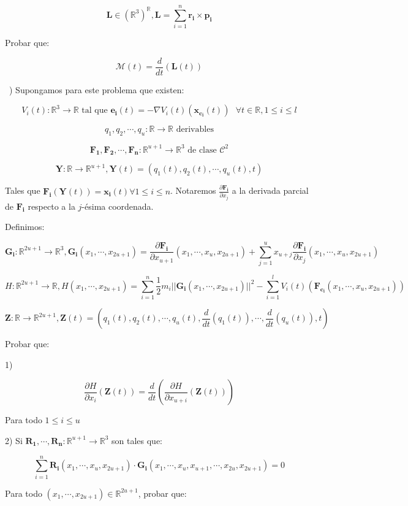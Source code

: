 \documentclass{article}
\newcommand{\FUNCION}{(\mathbb{R}^3)^\mathbb{R}\xspace}
\newcommand{\DT}[1]{\frac{d }{dt}\left( #1 \right)\xspace}
\newcommand{\V}[1]{\mathbf{#1}\xspace}
\newcommand{\M}{\mathcal{M}\xspace}
\newcounter{problemCounter}
\newcommand{\problem}{\stepcounter{problemCounter} \ \newline \theproblemCounter ) \xspace}
\begin{document}
$$\V{L} \in \FUNCION, \V{L} = \sum_{i=1}^{n}{\V{r_i} \times \V{p_i}}$$

Probar que:

$$\M(t) = \DT{\V{L}(t)}$$

\problem Supongamos para este problema que existen:

$$V_i(t) : \mathbb{R}^3 \rightarrow \mathbb{R} \mbox{ tal que } \V{e_i}(t) = -\nabla V_i(t)(\V{x_{c_i}}(t))\ \ \ \forall t\in \mathbb{R}, 1 \leq i \leq l$$

$$q_1,q_2,\cdots,q_u : \mathbb{R} \rightarrow \mathbb{R} \mbox{ derivables}$$

$$\V{F_1},\V{F_2},\cdots,\V{F_n} : \mathbb{R}^{u+1} \rightarrow \mathbb{R}^3 \mbox{ de clase } \mathcal{C}^2$$

$$\V{Y} : \mathbb{R} \rightarrow \mathbb{R}^{u+1} , \V{Y}(t) = (q_1(t),q_2(t),\cdots,q_u(t),t)$$

Tales que $\V{F_i}(\V{Y}(t)) = \V{x_i}(t) \forall 1 \leq i \leq n$. Notaremos $\frac{\partial \V{F_i}}{\partial x_j}$
a la derivada parcial de $\V{F_i}$ respecto a la $j$-ésima coordenada.

Definimos:

$$\V{G_i} : \mathbb{R}^{2u+1} \rightarrow \mathbb{R}^3, \V{G_i}(x_1,\cdots,x_{2u+1}) = 
 \frac{\partial \V{F_i}}{\partial x_{u+1}}(x_1,\cdots,x_u,x_{2u+1}) + \sum_{j=1}^u{x_{u+j} \frac{\partial \V{F_i}}{\partial x_j}(x_1,\cdots,x_u,x_{2u+1})} $$

$$H : \mathbb{R}^{2u+1} \rightarrow \mathbb{R}, H(x_1,\cdots,x_{2u+1}) = 
\sum_{i=1}^n{\frac{1}{2}m_i||\V{G_i}(x_1,\cdots,x_{2u+1})||^2} - \sum_{i=1}^l{V_i(t)(\V{F_{c_i}}(x_1,\cdots,x_u,x_{2u+1}))}$$

$$\V{Z} : \mathbb{R} \rightarrow \mathbb{R}^{2u+1}, \V{Z}(t) = (q_1(t),q_2(t),\cdots,q_u(t),\DT{q_1(t)},\cdots,\DT{q_u(t)},t)$$

Probar que:

1)

$$\frac{\partial H}{\partial x_i}(\V{Z}(t)) = \DT{\frac{\partial H}{\partial x_{u+i}}(\V{Z}(t))}$$

Para todo $1 \leq i \leq u$

2) Si $\V{R_1},\cdots,\V{R_n} : \mathbb{R}^{u+1} \rightarrow \mathbb{R}^3$ son tales que:

$$\sum_{i=1}^n{\V{R_i}(x_1,\cdots,x_u,x_{2u+1}) \cdot \V{G_i}(x_1,\cdots,x_u,x_{u+1},\cdots,x_{2u},x_{2u+1})} = 0$$

Para todo $(x_1,\cdots,x_{2u+1}) \in \mathbb{R}^{2u+1}$, probar que:
\end{document}
